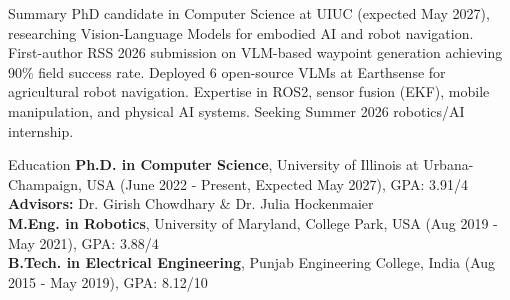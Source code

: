 \documentclass{resume} %
\begin{document}
\vspace{-0.2cm}
\begin{rSection}{Summary}
PhD candidate in Computer Science at UIUC (expected May 2027), researching Vision-Language Models for embodied AI and robot navigation. First-author RSS 2026 submission on VLM-based waypoint generation achieving 90\% field success rate. Deployed 6 open-source VLMs at Earthsense for agricultural robot navigation. Expertise in ROS2, sensor fusion (EKF), mobile manipulation, and physical AI systems. Seeking Summer 2026 robotics/AI internship.
\end{rSection}

\begin{rSection}{Education}
    \textbf{Ph.D. in Computer Science}, University of Illinois at Urbana-Champaign, USA (June 2022 - Present, Expected May 2027), GPA: 3.91/4 \\
    \textbf{Advisors:} Dr. Girish Chowdhary \& Dr. Julia Hockenmaier \\
    \textbf{M.Eng. in Robotics}, University of Maryland, College Park, USA (Aug 2019 - May 2021), GPA: 3.88/4 \\
    \textbf{B.Tech. in Electrical Engineering}, Punjab Engineering College, India (Aug 2015 - May 2019), GPA: 8.12/10
\end{rSection}
\end{document}
